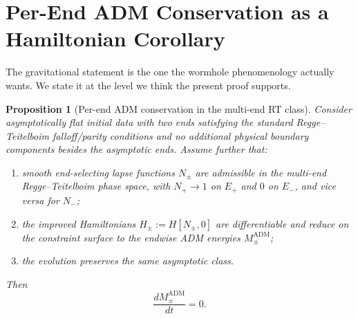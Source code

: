 \documentclass[aps,prd,onecolumn,nofootinbib,superscriptaddress]{revtex4-2}
\newtheorem{proposition}{Proposition}
\begin{document}
\section{Per-End ADM Conservation as a Hamiltonian Corollary}
\label{sec:adm}

The gravitational statement is the one the wormhole phenomenology actually wants. We state it at the level we think the present proof supports.

\begin{proposition}[Per-end ADM conservation in the multi-end RT class]
\label{prop:adm}
Consider asymptotically flat initial data with two ends satisfying the standard Regge--Teitelboim falloff/parity conditions and no additional physical boundary components besides the asymptotic ends. Assume further that:
\begin{enumerate}
    \item smooth end-selecting lapse functions $N_\pm$ are admissible in the multi-end Regge--Teitelboim phase space, with $N_+\to 1$ on $E_+$ and $0$ on $E_-$, and vice versa for $N_-$;
    \item the improved Hamiltonians $H_\pm := H[N_\pm,0]$ are differentiable and reduce on the constraint surface to the endwise ADM energies $M_\pm^{\mathrm{ADM}}$;
    \item the evolution preserves the same asymptotic class.
\end{enumerate}
Then
\begin{equation}
\frac{dM_\pm^{\mathrm{ADM}}}{dt}=0.
\end{equation}
\end{proposition}
\end{document}
